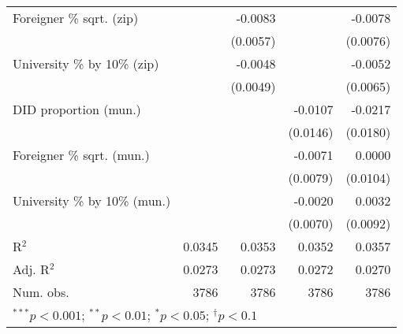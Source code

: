 \begin{tabular}{l D{.}{.}{4.5} D{.}{.}{4.5} D{.}{.}{4.5} D{.}{.}{4.5}}
Foreigner \% sqrt. (zip)          &             & -0.0083     &             & -0.0078     \\
                                  &             & (0.0057)    &             & (0.0076)    \\
University \% by 10\% (zip)       &             & -0.0048     &             & -0.0052     \\
                                  &             & (0.0049)    &             & (0.0065)    \\
DID proportion (mun.)             &             &             & -0.0107     & -0.0217     \\
                                  &             &             & (0.0146)    & (0.0180)    \\
Foreigner \% sqrt. (mun.)         &             &             & -0.0071     & 0.0000      \\
                                  &             &             & (0.0079)    & (0.0104)    \\
University \% by 10\% (mun.)      &             &             & -0.0020     & 0.0032      \\
                                  &             &             & (0.0070)    & (0.0092)    \\
\midrule
R$^2$                             & 0.0345      & 0.0353      & 0.0352      & 0.0357      \\
Adj. R$^2$                        & 0.0273      & 0.0273      & 0.0272      & 0.0270      \\
Num. obs.                         & 3786        & 3786        & 3786        & 3786        \\
\bottomrule
{}
\end{tabular}
